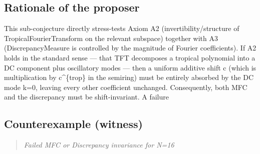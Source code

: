 \documentclass[11pt,a4paper]{article}
\begin{document}
\subsection*{Rationale of the proposer}
This sub-conjecture directly stress-tests Axiom A2 (invertibility/structure of TropicalFourierTransform on the relevant subspace) together with A3 (DiscrepancyMeasure is controlled by the magnitude of Fourier coefficients). If A2 holds in the standard sense — that TFT decomposes a tropical polynomial into a DC component plus oscillatory modes — then a uniform additive shift c (which is multiplication by c\textasciicircum{}\{trop\} in the semiring) must be entirely absorbed by the DC mode k=0, leaving every other coefficient unchanged. Consequently, both MFC and the discrepancy must be shift-invariant. A failure 

\subsection*{Counterexample (witness)}
\begin{quote}\itshape
Failed MFC or Discrepancy invariance for N=16
\end{quote}
\end{document}
